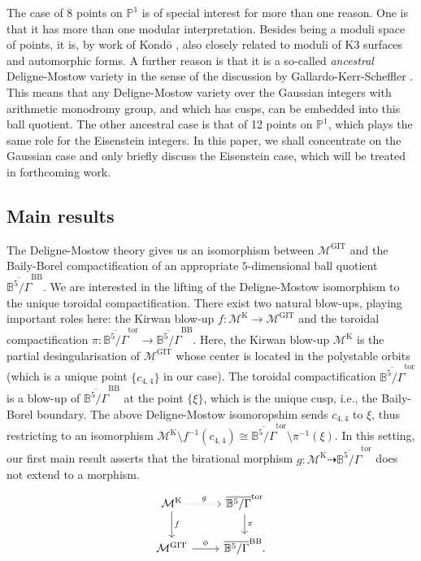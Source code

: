 \documentclass[12pt, pdftex]{amsart}
\theoremstyle{plain}
\theoremstyle{definition}
\numberwithin{equation}{section}
\def\P{{\mathbb P}}
\def\B{{\mathbb B}}
\def\GIT{\mathrm{GIT}}
\def\K{\mathrm{K}}
\def\tor{\mathrm{tor}}
\def\BB{\mathrm{BB}}
\def\M{\mathcal{M}}
\begin{document}
The case of 8 points on $\P^1$ is of special interest for more than one reason. One is that it has more than one modular interpretation. Besides being a moduli space of points, it is, by work of Kond\={o}
\cite{Ko07a}, also closely related to moduli of K3 surfaces and automorphic forms. A further reason is that it is 
a so-called {\em ancestral} Deligne-Mostow variety in the sense of the discussion by Gallardo-Kerr-Scheffler \cite{GKS21}. This means that any Deligne-Mostow variety over the Gaussian integers
with arithmetic monodromy group, and which has cusps, can be embedded into this ball quotient. The other ancestral case is that of 12 points on $\P^1$, which plays the same role for the Eisenstein integers. In this paper, 
we shall concentrate on the Gaussian case and only briefly discuss the Eisenstein case, which will be treated in forthcoming work.

\subsection{Main results}
The Deligne-Mostow theory \cite{DM86} gives us an isomorphism between $\M^{\GIT}$ and the Baily-Borel compactification of an appropriate $5$-dimensional ball quotient $\overline{\B^5/\Gamma}^{\BB}$.
We are interested in the lifting of the Deligne-Mostow isomorphism to the unique toroidal compactification.
There exist two natural blow-ups, playing important roles here: the Kirwan blow-up $f:\M^{\K}\to\M^{\GIT}$ and the toroidal compactification $\pi:\overline{\B^5/\Gamma}^{\tor}\to\overline{\B^5/\Gamma}^{\BB}$.
Here, the Kirwan blow-up $\M^{\K}$ is the partial desingularisation of $\M^{\GIT}$ whose center is located in the polystable orbits (which is a unique point  $\{c_{4,4}\}$ in our case).
The toroidal compactification $\overline{\B^5/\Gamma}^{\tor}$ is a blow-up of $\overline{\B^5/\Gamma}^{\BB}$ at the point $\{\xi\}$, which is the unique cusp, i.e., the Baily-Borel boundary.
The above Deligne-Mostow isomoropshim sends $c_{4,4}$ to $\xi$, thus restricting to an isomorphism $\M^{\K}\setminus f^{-1}(c_{4,4})\cong \overline{\B^5/\Gamma}^{\tor}\setminus\pi^{-1}(\xi)$.
In this setting, our first main result asserts that the birational morphism $g:\M^{\K}\dashrightarrow\overline{\B^5/\Gamma}^{\tor}$ does not extend to a morphism.
\[\begin{tikzcd}
  \M^{\K} \ar[r, dotted, "g"] \arrow[d, "f"] & \overline{\B^5/\Gamma}^{\tor} \arrow[d, "\pi"] \\
  \M^{\GIT} \arrow[r, "\phi"] & \overline{\B^5/\Gamma}^{\BB}.
\end{tikzcd}\]
\end{document}
